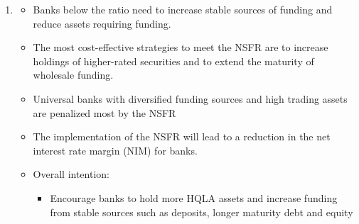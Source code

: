 \documentclass[a4paper,12pt]{article}
\begin{document}
\begin{enumerate}
	\item \cite{King2013}

	\begin{itemize}
		\item Banks below the ratio need to increase stable sources of funding and reduce assets requiring funding.

		\item The most cost-effective strategies to meet the NSFR are to increase holdings of higher-rated securities and to extend the maturity of wholesale funding. 

		\item Universal banks with diversified funding sources and high trading assets are penalized most by the NSFR

		\item The implementation of the NSFR will lead to a reduction in the net interest rate margin (NIM) for banks.

		\item Overall intention:
			\begin{itemize}
				\item Encourage banks to hold more HQLA assets and increase funding from stable sources such as deposits, longer maturity debt and equity
			\end{itemize} 
	\end{itemize}

\end{enumerate}

\newpage

\end{document}
